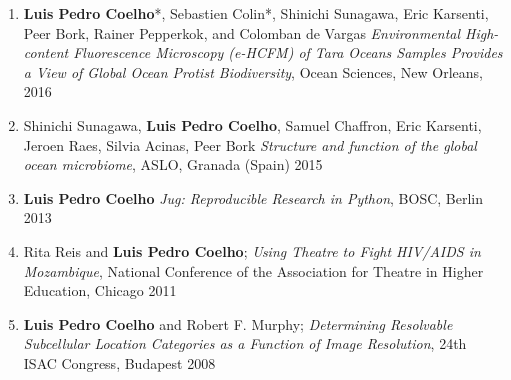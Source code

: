 \documentclass{article}
\begin{document}
\begin{enumerate}
\item \textbf{Luis Pedro Coelho}*, Sebastien Colin*, Shinichi Sunagawa, Eric
Karsenti, Peer Bork, Rainer Pepperkok, and Colomban de Vargas
\emph{Environmental High-content Fluorescence Microscopy (e-HCFM) of Tara
Oceans Samples Provides a View of Global Ocean Protist Biodiversity}, Ocean
Sciences, New Orleans, 2016
\item Shinichi Sunagawa, \textbf{Luis Pedro Coelho}, Samuel Chaffron, Eric
Karsenti, Jeroen Raes, Silvia Acinas, Peer Bork \emph{Structure and function of
the global ocean microbiome}, ASLO, Granada (Spain) 2015
\item \textbf{Luis Pedro Coelho} \emph{Jug: Reproducible Research in Python},
BOSC, Berlin 2013
\item Rita Reis and \textbf{Luis Pedro Coelho}; \emph{Using Theatre to Fight
HIV/AIDS in Mozambique}, National Conference of the Association for Theatre in
Higher Education, Chicago 2011
\item \textbf{Luis Pedro Coelho} and Robert F. Murphy; \emph{Determining
Resolvable Subcellular Location Categories as a Function of Image Resolution},
24th ISAC Congress, Budapest 2008
\end{enumerate}
\end{document}
